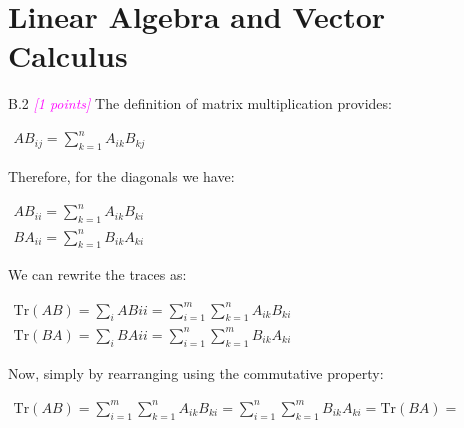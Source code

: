 \documentclass{article}
\newcommand{\1}{\mathbf{1}}
\newcommand{\points}[1]{\small\textcolor{magenta}{\emph{[#1 points]}} \normalsize}
\begin{document}
\section*{Linear Algebra and Vector Calculus}
B.2 \points{1} The definition of matrix multiplication provides:
\begin{center}
	$\begin{aligned}AB_{ij}=\sum_{k=1}^{n}A_{ik}B_{kj}\end{aligned}$
\end{center}
Therefore, for the diagonals we have:
\begin{center}
	$\begin{aligned}AB_{ii}=\sum_{k=1}^{n}A_{ik}B_{ki}\\
	BA_{ii}=\sum_{k=1}^{n}B_{ik}A_{ki}	\end{aligned}$
\end{center}
We can rewrite the traces as:
\begin{center}
	$\begin{aligned}\text{Tr}(AB)=\sum_{i}ABii=\sum_{i=1}^{m}\sum_{k=1}^{n}A_{ik}B_{ki}\\
	\text{Tr}(BA)=\sum_{i}BAii=\sum_{i=1}^{n}\sum_{k=1}^{m}B_{ik}A_{ki}	\end{aligned}$
\end{center}
Now, simply by rearranging using the commutative property:
\begin{center}
	$\begin{aligned}\text{Tr}(AB)=\sum_{i=1}^{m}\sum_{k=1}^{n}A_{ik}B_{ki}=\sum_{i=1}^{n}\sum_{k=1}^{m}B_{ik}A_{ki}=\text{Tr}(BA)=	\end{aligned}$
\end{center}
\end{document}
